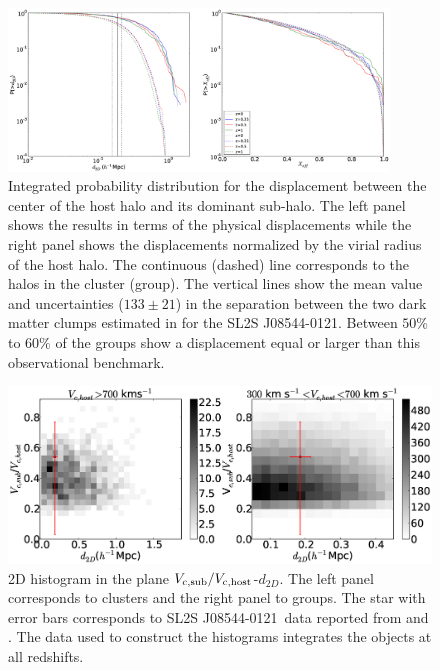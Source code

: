 \documentclass{emulateapj}
\newcommand{\hkpc}{{\ifmmode{h^{-1}{\rm kpc}}\else{$h^{-1}$kpc }\fi}}
\newcommand{\bullg}{SL2S J08544-0121}
\begin{document}
\begin{figure}
\begin{center}
\includegraphics[width=0.9\textwidth]{figure_1.eps}
\end{center}
\caption{
  Integrated probability distribution for the displacement between the
  center of the host halo and its dominant sub-halo. The left panel
  shows the results in terms of the physical displacements while the
  right panel shows the displacements normalized by the virial radius
  of the host halo. The continuous (dashed) line corresponds to the halos in the
  cluster (group).
  The vertical lines show the mean value and uncertainties ($133\pm
  21$\hkpc) in the  separation between the two dark matter clumps
  estimated in \citet{Gastaldello} for the \bullg. Between $50\%$
  to $60\%$ of the groups show a displacement equal or larger than
  this observational benchmark.}
\label{fig:displacement}
\end{figure}

\begin{figure}
\begin{center}
\includegraphics[width=1.0\textwidth]{figure_2.eps} 
\end{center}
\caption{2D histogram in the plane $V_{\rm c,sub}/V_{\rm
    c,host}$-$d_{2D}$. The left panel corresponds to clusters and the
  right panel to groups. The star with error bars corresponds to
  \bullg\ data reported from \citet{2013A&A...552A..80M} and
  \citet{Gastaldello}. The data used to construct the histograms
  integrates the objects at all redshifts. }
\label{fig:mass_displacement}
\end{figure}
\end{document}
